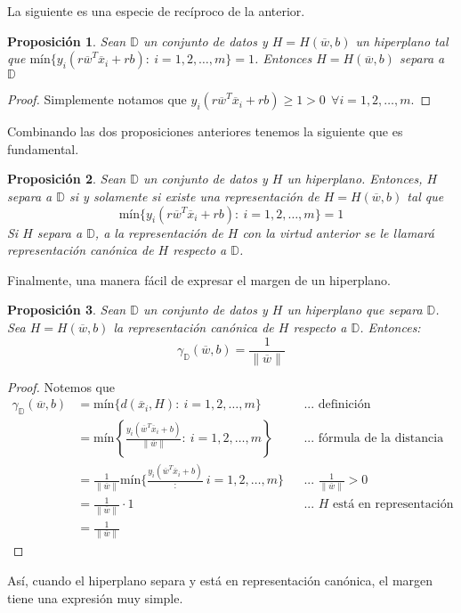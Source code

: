 \documentclass[11pt]{article}
\newtheorem{proposition}{Proposición}[section]
\newcommand{\wv}{\overline{w}}
\newcommand{\x}{\overline{x}}
\newcommand{\Sm}{1,2,\ldots, m}
\newcommand{\Dat}{\mathbb{D}}
\newcommand{\nw}{\|\wv\|}
\begin{document}
La siguiente es una especie de recíproco de la anterior.

\begin{proposition}
Sean $\Dat$ un conjunto de datos y $H=H(\wv, b)$ un hiperplano tal que $\text{mín}\{y_{i}(r\wv^{T}\x_{i}+rb):\ i=\Sm \}=1$. Entonces $H=H(\wv, b)$ separa a $\Dat$
\end{proposition}
\begin{proof}
Simplemente notamos que $y_{i}(r\wv^{T}\x_{i}+rb)\geq1>0\ \ \forall i=\Sm$.
\end{proof}
 
Combinando las dos proposiciones anteriores tenemos la siguiente que es fundamental.
 
\begin{proposition}
Sean $\Dat$ un conjunto de datos y $H$ un hiperplano. Entonces, $H$ separa a $\Dat$ si y solamente si existe una representación de $H=H(\wv, b)$ tal que
$$\text{mín}\{y_{i}(r\wv^{T}\x_{i}+rb):\ i=\Sm \}=1$$
Si $H$ separa a $\Dat$, a la representación de $H$ con la virtud anterior se le llamará \emph{representación canónica de $H$ respecto a $\Dat$}.
\end{proposition}

Finalmente, una manera fácil de expresar el margen de un hiperplano.

\begin{proposition}
Sean $\Dat$ un conjunto de datos y $H$ un hiperplano que separa $\Dat$. Sea $H=H(\wv, b)$ la representación canónica de $H$ respecto a $\Dat$. Entonces:
$$\gamma_{\Dat}(\wv, b)=\frac{1}{\nw}$$
\end{proposition}
\begin{proof}
Notemos que
\begin{equation*}
\begin{aligned}
\gamma_{\Dat}(\wv, b)&=\text{mín}\{d(\x_{i}, H):\ i=\Sm\} &&\text{... definición}\\
&=\text{mín}\left\{\frac{y_{i}(\wv^{T}\x_{i}+b)}{\nw}:\ i=\Sm\right\} &&\text{... fórmula de la distancia}\\
&=\frac{1}{\nw}\text{mín}\{\frac{y_{i}(\wv^{T}\x_{i}+b)}:\ i=\Sm\} &&\text{... $\frac{1}{\nw}>0$}\\
&=\frac{1}{\nw}\cdot 1 &&\text{... $H$ está en representación canónica}\\
&=\frac{1}{\nw}
\end{aligned}
\end{equation*}
\end{proof}

Así, cuando el hiperplano separa y está en representación canónica, el margen tiene una expresión muy simple.

 
\end{document}
